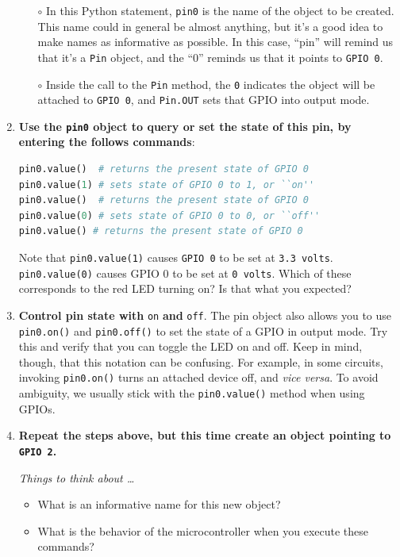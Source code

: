\begin{enumerate}
	\begin{itemize}
		\item[$\circ$] In this Python statement, \texttt{pin0} is the name of the object to be created.
		This name could in general be almost anything, but it's a good idea to make names as informative as possible.
		In this case, ``pin'' will remind us that it's a \texttt{Pin} object, and the ``0'' reminds us that it points to \texttt{GPIO 0}.


	\item[$\circ$] Inside the call to the \texttt{Pin} method, the \texttt{0} indicates the object will be attached to \texttt{GPIO 0}, and \texttt{Pin.OUT} sets that GPIO into output mode.
	\end{itemize}

	\item \textbf{Use the \texttt{pin0} object to query or set the state of this pin, by entering the follows commands}:
\begin{lstlisting}[language=Python]
pin0.value()  # returns the present state of GPIO 0
pin0.value(1) # sets state of GPIO 0 to 1, or ``on''
pin0.value()  # returns the present state of GPIO 0
pin0.value(0) # sets state of GPIO 0 to 0, or ``off''
pin0.value() # returns the present state of GPIO 0
\end{lstlisting}
	Note that \texttt{pin0.value(1)} causes \texttt{GPIO 0} to be set at \texttt{3.3 volts}.
	\texttt{pin0.value(0)} causes GPIO 0 to be set at \texttt{0 volts}.
	Which of these corresponds to the red LED turning on? Is that what you expected?

	\item \textbf{Control pin state with } \lstinline{on} \textbf{and} \lstinline{off}.
	The pin object also allows you to use \lstinline{pin0.on()} and \lstinline{pin0.off()} to set the state of a GPIO in output mode.
	Try this and verify that you can toggle the LED on and off.
	Keep in mind, though, that this notation can be confusing.
	For example, in some circuits, invoking \lstinline{pin0.on()} turns an attached device  off, and \textit{vice versa}.
	To avoid ambiguity, we usually stick with the \lstinline{pin0.value()} method when using GPIOs.

	\item \textbf{Repeat the steps above, but this time create an object pointing to \texttt{GPIO 2}.}

	\emph{Things to think about \dots}
	\begin{itemize}
		\item What is an informative name for this new object?
		\item What is the behavior of the microcontroller when you execute these commands?
	\end{itemize}
\end{enumerate}

